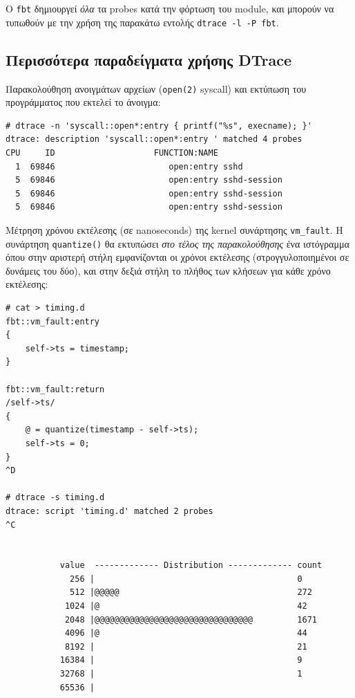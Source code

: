 \documentclass[12pt]{article}
\begin{document}
Ο \lstinline{fbt} δημιουργεί \textit{όλα} τα probes κατά την φόρτωση του
module, και μπορούν να τυπωθούν με την χρήση της παρακάτω εντολής
\lstinline{dtrace -l -P fbt}.

\subsection{Περισσότερα παραδείγματα χρήσης DTrace}

Παρακολούθηση ανοιγμάτων αρχείων (\lstinline{open(2)} syscall) και εκτύπωση του
προγράμματος που εκτελεί το άνοιγμα:

\begin{lstlisting}
# dtrace -n 'syscall::open*:entry { printf("%s", execname); }'
dtrace: description 'syscall::open*:entry ' matched 4 probes
CPU     ID                    FUNCTION:NAME
  1  69846                       open:entry sshd
  5  69846                       open:entry sshd-session
  5  69846                       open:entry sshd-session
  5  69846                       open:entry sshd-session
\end{lstlisting}

Μέτρηση χρόνου εκτέλεσης (σε nanoseconds) της kernel συνάρτησης
\lstinline{vm_fault}. Η συνάρτηση \lstinline{quantize()} θα εκτυπώσει
\textit{στο τέλος της παρακολούθησης} ένα ιστόγραμμα όπου στην αριστερή στήλη
εμφανίζονται οι χρόνοι εκτέλεσης (στρογγυλοποιημένοι σε δυνάμεις του δύο), και
στην δεξιά στήλη το πλήθος των κλήσεων για κάθε χρόνο εκτέλεσης:

\begin{lstlisting}
# cat > timing.d
fbt::vm_fault:entry
{
	self->ts = timestamp;
}

fbt::vm_fault:return
/self->ts/
{
	@ = quantize(timestamp - self->ts);
	self->ts = 0;
}
^D

# dtrace -s timing.d
dtrace: script 'timing.d' matched 2 probes
^C


           value  ------------- Distribution ------------- count
             256 |                                         0
             512 |@@@@@                                    272
            1024 |@                                        42
            2048 |@@@@@@@@@@@@@@@@@@@@@@@@@@@@@@@@         1671
            4096 |@                                        44
            8192 |                                         21
           16384 |                                         9
           32768 |                                         1
           65536 |
\end{lstlisting}
\end{document}
